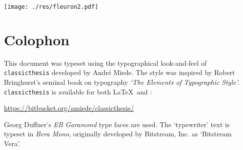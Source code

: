 \pagestyle{empty}

\hfill

\vfill
\begin{center}
\texttt{[image: ./res/fleuron2.pdf]} \\ \smallskip
\end{center}


\section*{Colophon}
This document was typeset using the typographical look-and-feel of \texttt{classicthesis} developed by Andr\'e Miede. 
The style was inspired by Robert Bringhurst's seminal book on typography \emph{`The Elements of Typographic Style'.} 
\texttt{classicthesis} is available for both \LaTeX\ and \mLyX: 
\begin{center}
\url{https://bitbucket.org/amiede/classicthesis/}
\end{center}
 
\bigskip


Georg Duffner's \emph{EB Garamond} type faces are used.
The `typewriter' text is typeset in \emph{Bera Mono}, 
originally developed by Bitstream, Inc. as `Bitstream Vera'.

%
%




